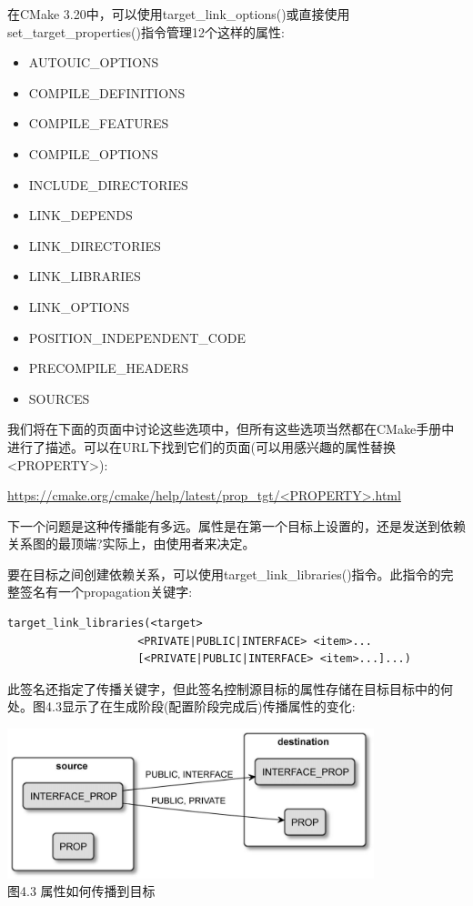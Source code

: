 在CMake 3.20中，可以使用target\_link\_options()或直接使用set\_target\_properties()指令管理12个这样的属性:

\begin{itemize}
\item 
AUTOUIC\_OPTIONS

\item 
COMPILE\_DEFINITIONS

\item 
COMPILE\_FEATURES

\item 
COMPILE\_OPTIONS

\item 
INCLUDE\_DIRECTORIES

\item 
LINK\_DEPENDS

\item 
LINK\_DIRECTORIES

\item 
LINK\_LIBRARIES

\item 
LINK\_OPTIONS

\item 
POSITION\_INDEPENDENT\_CODE

\item 
PRECOMPILE\_HEADERS

\item 
SOURCES
\end{itemize}

我们将在下面的页面中讨论这些选项中，但所有这些选项当然都在CMake手册中进行了描述。可以在URL下找到它们的页面(可以用感兴趣的属性替换<PROPERTY>):

\url{https://cmake.org/cmake/help/latest/prop_tgt/<PROPERTY>.html}

下一个问题是这种传播能有多远。属性是在第一个目标上设置的，还是发送到依赖关系图的最顶端?实际上，由使用者来决定。

要在目标之间创建依赖关系，可以使用target\_link\_libraries()指令。此指令的完整签名有一个propagation关键字:

\begin{lstlisting}[style=styleCMake]
target_link_libraries(<target>
					<PRIVATE|PUBLIC|INTERFACE> <item>...
					[<PRIVATE|PUBLIC|INTERFACE> <item>...]...)
\end{lstlisting}

此签名还指定了传播关键字，但此签名控制源目标的属性存储在目标目标中的何处。图4.3显示了在生成阶段(配置阶段完成后)传播属性的变化:

\begin{center}
\includegraphics[width=0.8\textwidth]{content/2/chapter4/images/3.jpg}\\
图4.3 属性如何传播到目标
\end{center}

